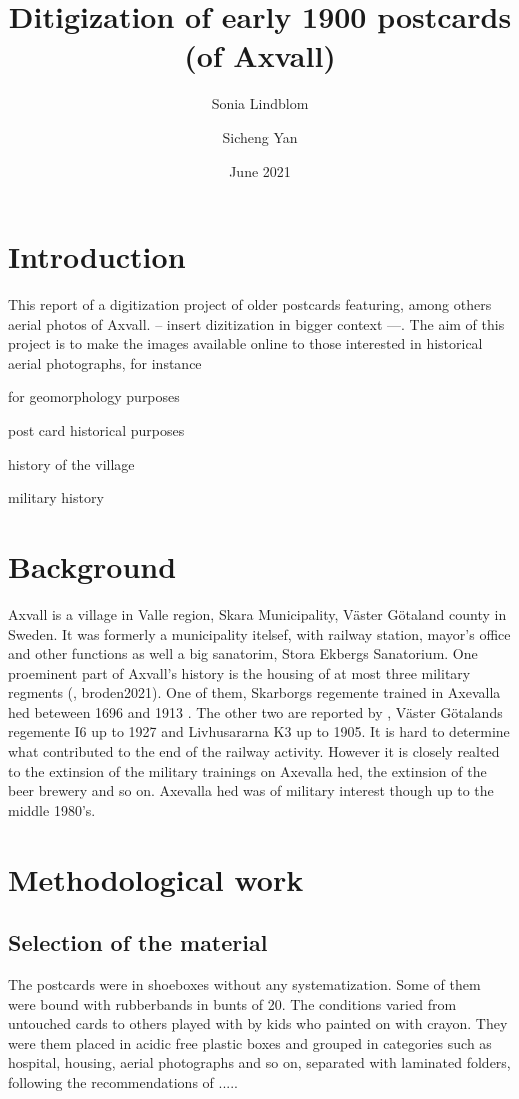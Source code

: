 \documentclass[12 pt]{paper}
\title{%
Ditigization of early 1900 postcards (of Axvall)  }
\author{Sonia Lindblom \and Sicheng Yan}
\date{June 2021}
\begin{document}


\section{Introduction}
This report of a digitization project of older postcards featuring, among others aerial photos of Axvall. -- insert dizitization in  bigger context ---. The aim of this project is to make the images available online to those interested in historical aerial photographs, for instance 
\begin{inparaenum}[i)]
	\item for geomorphology purposes \autocite[cf.][]{gomez2015}
	\item post card historical purposes
	\item history of the village
	\item military history
\end{inparaenum}
\section{Background}
Axvall is a village in Valle region, Skara Municipality, Väster Götaland county in Sweden. It was formerly a municipality itelsef, with railway station, mayor's office and other functions as well a big sanatorim, Stora Ekbergs Sanatorium. One proeminent part of Axvall's history is the housing of at most three military regments (, broden2021). One of them, Skarborgs regemente trained in Axevalla hed beteween 1696 and 1913 \autocite{frykmer1992}. The other two are reported by \textcite{broden2021}, Väster Götalands regemente I6 up to 1927 and Livhusararna K3 up to 1905. It is hard to determine what contributed to the end of the railway activity. However it is closely realted to the extinsion of the military trainings on Axevalla hed, the extinsion of the beer brewery and so on. Axevalla hed was of military interest though up to the middle 1980's.

\section{Methodological work}%
\subsection{Selection of the material}

The postcards were in shoeboxes without any systematization. Some of them were bound with rubberbands in bunts of 20. The conditions varied from untouched cards to others played with by kids who painted on with crayon. They were them placed in acidic free plastic boxes and grouped in categories such as hospital, housing, aerial photographs and so on, separated with laminated folders, following the recommendations of ..... 
 
\end{document}
